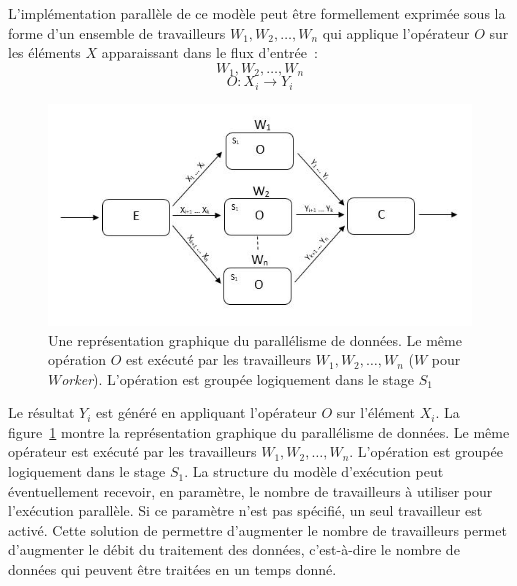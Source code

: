 \goodbreak
%
\begin{samepage}
L'impl\'ementation parall\`ele de ce mod\`ele peut \^etre formellement
exprim\'ee sous la forme d'un ensemble de travailleurs $W_1, W_2,\ldots, W_n$ qui
applique l'op\'erateur $O$ sur les \'el\'ements $X$ apparaissant dans
le flux d'entr\'ee~:
%
\[
	W_1, W_2,\ldots, W_n
\]
%
\[
	O : X_i \rightarrow Y_i
\]
\end{samepage}

\begin{figure}[ht]
\centering
     \includegraphics[width=1.0\textwidth]{Figures/DataParallelisme.jpg}
      \caption[Une repr\'esentation graphique du parall\'elisme de donn\'ees.]{Une repr\'esentation graphique du parall\'elisme de donn\'ees. Le m\^eme op\'eration $O$ est ex\'ecut\'e par les travailleurs $W_1, W_2,\ldots, W_n$ ($W$ pour \emph{$W$orker}). L'op\'eration est group\'ee logiquement dans le stage $S_1$}
       \label{DataParallelisme.fig}
\end{figure}


Le r\'esultat $Y_i$ est g\'en\'er\'e en appliquant l'op\'erateur $O$ sur l'\'el\'ement $X_i$. La figure~\ref{DataParallelisme.fig} montre la repr\'esentation graphique du parall\'elisme de donn\'ees. Le m\^eme op\'erateur est ex\'ecut\'e par les travailleurs $W_1, W_2,\ldots, W_n$. L'op\'eration est group\'ee logiquement dans le stage $S_1$. La structure du mod\`ele d'ex\'ecution peut \'eventuellement recevoir, en param\`etre, le nombre de travailleurs \`a utiliser pour l'ex\'ecution parall\`ele. Si ce param\`etre n'est pas sp\'ecifi\'e, un seul travailleur est activ\'e. Cette solution de permettre d'augmenter le nombre de travailleurs permet d'augmenter le d\'ebit du traitement des donn\'ees, c'est-\`a-dire le nombre de donn\'ees qui peuvent \^etre trait\'ees en un temps donn\'e.



